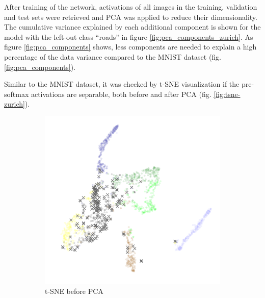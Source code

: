 \documentclass[10pt]{article}
\begin{document}
After training of the network, activations of all images in the training, validation and test sets were retrieved and \gls{PCA} was applied to reduce their dimensionality. The cumulative variance explained by each additional component is shown for the model with the left-out class ``roads'' in figure \ref{fig:pca_components_zurich}. As figure \ref{fig:pca_components} shows, less components are needed to explain a high percentage of the data variance compared to the MNIST dataset (fig. \ref{fig:pca_components}). 

Similar to the MNIST dataset, it was checked by \gls{t-SNE} visualization if the pre-softmax activations are separable, both before and after \gls{PCA} (fig. \ref{fig:tsne-zurich}).

\begin{figure}[H]
    \centering
    \begin{subfigure}{.49\textwidth}
        \centering
        \includegraphics[width=\textwidth]{t-SNE_wo_cl2_before_PCA}
        \caption{\gls{t-SNE} before \gls{PCA}}
    \end{subfigure}
    \begin{subfigure}{.5\textwidth}
        \centering

\end{subfigure}
\end{figure}
\end{document}
